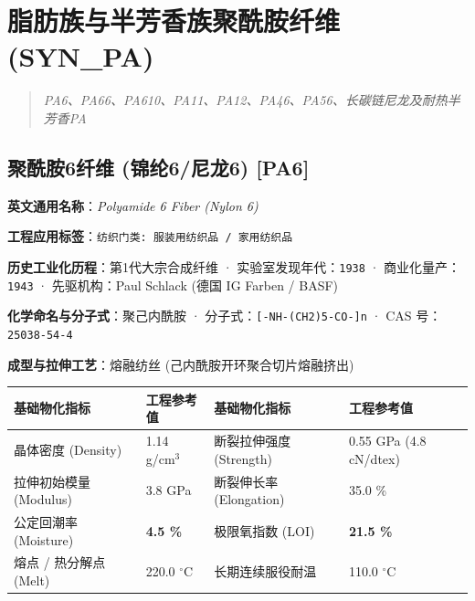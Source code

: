 \documentclass[11pt,openright,twoside,UTF8]{ctexbook}
\begin{document}
\chapter{脂肪族与半芳香族聚酰胺纤维 (SYN\_PA)}
\begin{quote}
\small\itshape
PA6、PA66、PA610、PA11、PA12、PA46、PA56、长碳链尼龙及耐热半芳香PA
\end{quote}

\section{聚酰胺6纤维 (锦纶6/尼龙6) [PA6]}
\label{sec:pa6}

\noindent\textbf{英文通用名称}：\textit{Polyamide 6 Fiber (Nylon 6)}\par
\noindent\textbf{工程应用标签}：\texttt{纺织门类: 服装用纺织品 / 家用纺织品}\par
\noindent\textbf{历史工业化历程}：第1代大宗合成纤维 · 实验室发现年代：\texttt{1938} · 商业化量产：\texttt{1943} · 先驱机构：Paul Schlack (德国 IG Farben / BASF)\par
\noindent\textbf{化学命名与分子式}：聚己内酰胺 · 分子式：\texttt{[-NH-(CH2)5-CO-]n} · CAS 号：\texttt{25038-54-4}\par
\noindent\textbf{成型与拉伸工艺}：熔融纺丝 (己内酰胺开环聚合切片熔融挤出)\par

\vspace{0.15cm}
\begin{center}
\small
\begin{tabularx}{\textwidth}{p{3.8cm}Xp{3.8cm}X}
\toprule
\textbf{基础物化指标} & \textbf{工程参考值} & \textbf{基础物化指标} & \textbf{工程参考值} \\
\midrule
晶体密度 (Density) & 1.14 g/cm$^3$ & 断裂拉伸强度 (Strength) & 0.55 GPa (4.8 cN/dtex) \\
拉伸初始模量 (Modulus) & 3.8 GPa & 断裂伸长率 (Elongation) & 35.0 \% \\
公定回潮率 (Moisture) & \textbf{4.5 \%} & 极限氧指数 (LOI) & \textbf{21.5 \%} \\
熔点 / 热分解点 (Melt) & 220.0 $^\circ\mathrm{C}$ & 长期连续服役耐温 & 110.0 $^\circ\mathrm{C}$ \\
\bottomrule
\end{tabularx}
\end{center}
\vspace{0.15cm}
\end{document}
